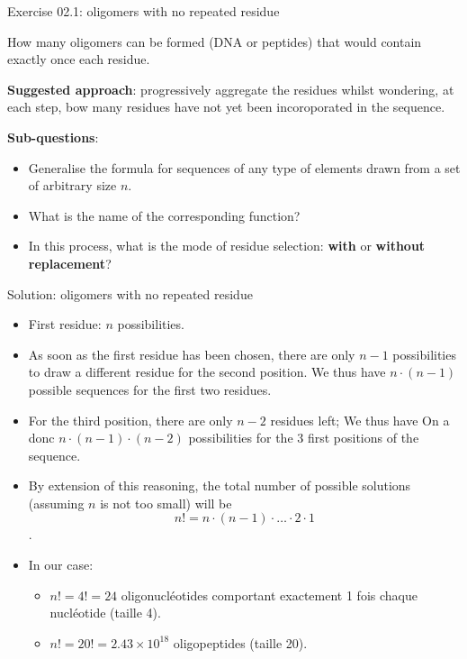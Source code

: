 \documentclass[ignorenonframetext,]{beamer}
\providecommand{\tightlist}{%
  \setlength{\itemsep}{0pt}\setlength{\parskip}{0pt}}
\begin{document}
\begin{frame}{Exercise 02.1: oligomers with no repeated residue}
\protect\hypertarget{exercise-02.1-oligomers-with-no-repeated-residue}{}

How many oligomers can be formed (DNA or peptides) that would contain
exactly once each residue.

\textbf{Suggested approach}: progressively aggregate the residues whilst
wondering, at each step, bow many residues have not yet been
incoroporated in the sequence.

\textbf{Sub-questions}:

\begin{itemize}
\item
  Generalise the formula for sequences of any type of elements drawn
  from a set of arbitrary size \(n\).
\item
  What is the name of the corresponding function?
\item
  In this process, what is the mode of residue selection: \textbf{with}
  or \textbf{without replacement}?
\end{itemize}

\end{frame}

\begin{frame}{Solution: oligomers with no repeated residue}
\protect\hypertarget{solution-oligomers-with-no-repeated-residue}{}

\begin{itemize}
\item
  First residue: \(n\) possibilities.
\item
  As soon as the first residue has been chosen, there are only \(n-1\)
  possibilities to draw a different residue for the second position. We
  thus have \(n \cdot (n-1)\) possible sequences for the first two
  residues.
\item
  For the third position, there are only \(n-2\) residues left; We thus
  have On a donc \(n \cdot (n-1) \cdot (n-2)\) possibilities for the 3
  first positions of the sequence.
\item
  By extension of this reasoning, the total number of possible solutions
  (assuming \(n\) is not too small) will be
  \[n! = n \cdot (n-1) \cdot \ldots \cdot 2 \cdot 1\].
\item
  In our case:

  \begin{itemize}
  \tightlist
  \item
    \(n! = 4! = 24\) oligonucléotides comportant exactement 1 fois
    chaque nucléotide (taille 4).
  \item
    \(n! = 20! = \ensuremath{2.43\times 10^{18}}\) oligopeptides (taille
    20).
  \end{itemize}
\end{itemize}

\end{frame}
\end{document}
